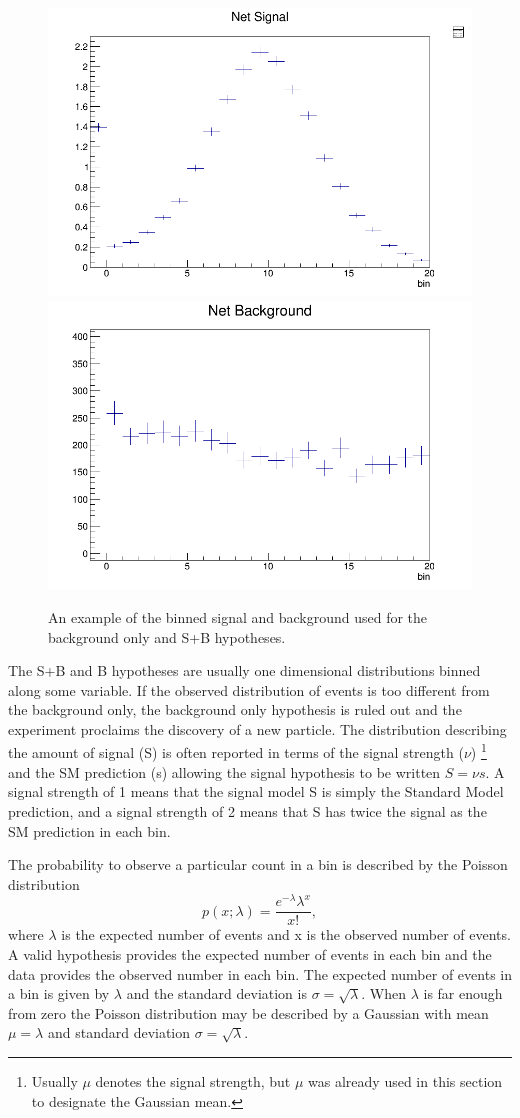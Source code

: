 \begin{figure}[h!]
  \centering
  \includegraphics[width=0.49\linewidth]{images/bdt_cats/binning_signal_example.png}
  \includegraphics[width=0.49\linewidth]{images/bdt_cats/binning_bg_example.png}
  \caption[An example of the signal and background used for the background only and S+B hypotheses.]
  {An example of the binned signal and background used for the background only and S+B hypotheses.}
  \label{fig:sb_binning_example}
\end{figure}

The S+B and B hypotheses are usually one dimensional distributions binned along some variable. If the observed distribution of events is too different from the background only, the background only hypothesis is ruled out and the experiment proclaims the discovery of a new particle. The distribution describing the amount of signal (S) is often reported in terms of the signal strength ($\nu$) \footnote{Usually $\mu$ denotes the signal strength, but $\mu$ was already used in this section to designate the Gaussian mean.} and the SM prediction (s) allowing the signal hypothesis to be written $S = \nu s$. A signal strength of 1 means that the signal model S is simply the Standard Model prediction, and a signal strength of 2 means that S has twice the signal as the SM prediction in each bin.  

The probability to observe a particular count in a bin is described by the Poisson distribution
\begin{equation}
p\left( x; \lambda \right) = \frac{{e^{ - \lambda } \lambda^x }}{{x!}},
\end{equation}
where $\lambda$ is the expected number of events and x is the observed number of events. A valid hypothesis provides the expected number of events in each bin and the data provides the observed number in each bin. The expected number of events in a bin is given by $\lambda$ and the standard deviation is $\sigma = \sqrt{\lambda}$. When $\lambda$ is far enough from zero the Poisson distribution may be described by a Gaussian with mean $\mu = \lambda$ and standard deviation $\sigma = \sqrt{\lambda}$.  

